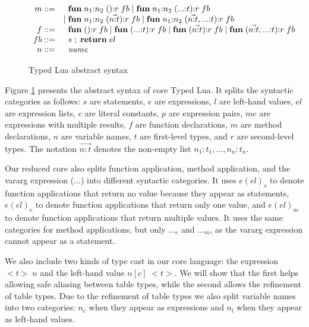 \begin{figure}[!ht]
$$\begin{array}{rl}
m ::= & \;\; \mathbf{fun} \; n_{1}{:}n_{2} \; (){:}r \; fb \; | \;
\mathbf{fun} \; n_{1}{:}n_{2} \; ({...}{:}t){:}r \; fb\\
& | \; \mathbf{fun} \; n_{1}{:}n_{2} \; (\vec{n{:}t}){:}r \; fb \; | \;
\mathbf{fun} \; n_{1}{:}n_{2} \; (\vec{n{:}t},{...}{:}t){:}r \; fb\\
f ::= & \;\; \mathbf{fun} \; (){:}r \; fb \; | \;
\mathbf{fun} \; ({...}{:}t){:}r \; fb \; | \;
\mathbf{fun} \; (\vec{n{:}t}){:}r \; fb \; | \;
\mathbf{fun} \; (\vec{n{:}t},{...}{:}t){:}r \; fb\\
fb ::= & \;\; s \;;\; \mathbf{return} \; el\\
n ::= & \;\; {\it name}\\
\end{array}
$$
\dend
\caption{Typed Lua abstract syntax}
\label{fig:syntax}
\end{figure}

Figure \ref{fig:syntax} presents the abstract syntax of core Typed Lua.
It splits the syntactic categories as follows:
$s$ are statements, $e$ are expressions, $l$ are left-hand values,
$el$ are expression lists, $c$ are literal constants, $p$ are expression pairs,
$me$ are expressions with multiple results, $f$ are function declarations,
$m$ are method declarations, $n$ are variable names,
$t$ are first-level types, and $r$ are second-level types.
The notation $\vec{n{:}t}$ denotes the non-empty list
$n_{1}{:}t_{1}, ..., n_{n}{:}t_{n}$.

Our reduced core also splits function application, method application, and
the vararg expression (${...}$) into different syntactic categories.
It uses $e(el)_{s}$ to denote function applications that return no value
because they appear as statements,
$e(el)_{e}$ to denote function applications that return only one value,
and $e(el)_{m}$ to denote function applications that return multiple values.
It uses the same categories for method applications, but only ${...}_{e}$
and ${...}_{m}$, as the vararg expression cannot appear as a statement.

We also include two kinds of type cast in our core language:
the expression ${<}t{>} \;n$ and the left-hand value $n[c] \; {<}t{>}$.
We will show that the first helps allowing safe aliasing between
table types, while the second allows the refinement of table types.
Due to the refinement of table types we also split variable names
into two categories: $n_{e}$ when they appear as expressions and
$n_{l}$ when they appear as left-hand values.

